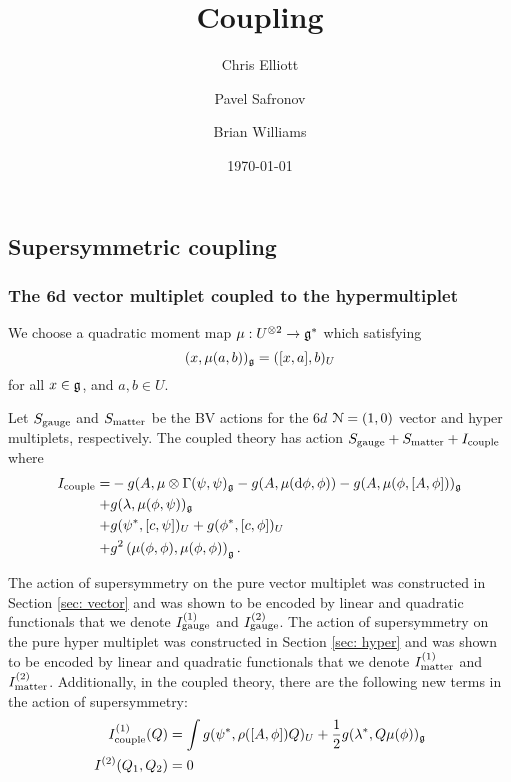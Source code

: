 \documentclass[10pt, oneside]{article}
\title{Coupling}
\author{Chris Elliott\and Pavel Safronov \and Brian Williams}
\date{\today}
\begin{document}
\maketitle

\subsection{Supersymmetric coupling}
\subsubsection{The 6d vector multiplet coupled to the hypermultiplet}

We choose a quadratic moment map $\mu : U^{\otimes 2} \to \mathfrak g^*$ which satisfying
\[
(x, \mu(a, b))_{\mathfrak g} = ([x, a], b)_U
\]
for all $x \in \mathfrak g$, and $a,b \in U$.

Let $S_{\rm gauge}$ and $S_{\rm matter}$ be the BV actions for the $6d$ $\mathcal N=(1,0)$ vector and hyper multiplets, respectively. 
The coupled theory has action $S_{\rm gauge} + S_{\rm matter} + I_{\rm couple}$ where
\begin{align*}
I_{\rm couple} = &- g (A, \mu \otimes \Gamma (\psi, \psi)_\mathfrak g - g (A, \mu({\rm d} \phi, \phi)) - g (A, \mu(\phi, [A, \phi]))_\mathfrak g \\ + & 
g (\lambda, \mu(\phi, \psi))_\mathfrak g \\ + & g (\psi^*, [c, \psi])_U + g (\phi^*, [c, \phi])_U \\ + & g^2 \left(\mu(\phi, \phi), \mu(\phi, \phi) \right)_\mathfrak g .
\end{align*}



The action of supersymmetry on the pure vector multiplet was constructed in Section \ref{sec: vector} and was shown to be encoded by linear and quadratic functionals that we denote $I^{(1)}_{\rm gauge}$ and $I^{(2)}_{\rm gauge}$. 
The action of supersymmetry on the pure hyper multiplet was constructed in Section \ref{sec: hyper} and was shown to be encoded by linear and quadratic functionals that we denote $I^{(1)}_{\rm matter}$ and $I^{(2)}_{\rm matter}$. 
Additionally, in the coupled theory, there are the following new terms in the action of supersymmetry:
\begin{align*}
I^{(1)}_{\rm couple} (Q) & = \int g (\psi^*, \rho([A, \phi]) Q)_U + \frac{1}{2} g (\lambda^*, Q \mu(\phi))_\mathfrak g \\
I^{(2)} (Q_1 , Q_2) & = 0 
\end{align*}
\end{document}
